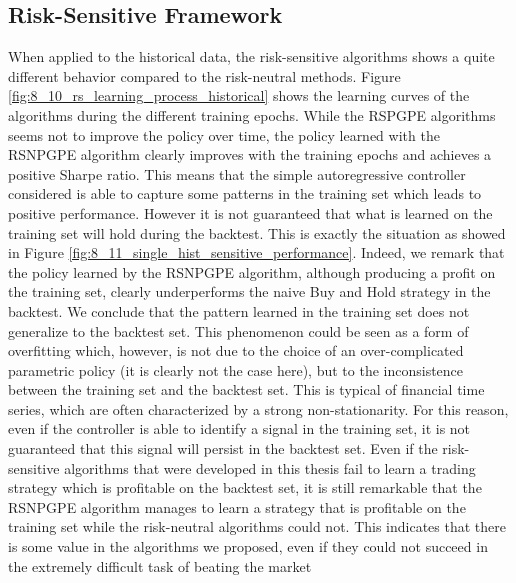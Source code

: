\subsection{Risk-Sensitive Framework}
When applied to the historical data, the risk-sensitive algorithms shows a quite different behavior compared to the risk-neutral methods. Figure \ref{fig:8_10_rs_learning_process_historical} shows the learning curves of the algorithms during the different training epochs. While the \gls{RSPGPE} algorithms seems not to improve the policy over time, the policy learned with the \gls{RSNPGPE} algorithm clearly improves with the training epochs and achieves a positive Sharpe ratio. This means that the simple autoregressive controller considered is able to capture some patterns in the training set which leads to positive performance. However it is not guaranteed that what is learned on the training set will hold during the backtest. This is exactly the situation as showed in Figure \ref{fig:8_11_single_hist_sensitive_performance}. Indeed, we remark that the policy learned by the \gls{RSNPGPE} algorithm, although producing a profit on the training set, clearly underperforms the naive Buy and Hold strategy in the backtest. We conclude that the pattern learned in the training set does not generalize to the backtest set. This phenomenon could be seen as a form of overfitting which, however, is not due to the choice of an over-complicated parametric policy (it is clearly not the case here), but to the inconsistence between the training set and the backtest set. This is typical of financial time series, which are often characterized by a strong non-stationarity. For this reason, even if the controller is able to identify a signal in the training set, it is not guaranteed that this signal will persist in the backtest set. Even if the risk-sensitive algorithms that were developed in this thesis fail to learn a trading strategy which is profitable on the backtest set, it is still remarkable that the \gls{RSNPGPE} algorithm manages to learn a strategy that is profitable on the training set while the risk-neutral algorithms could not. This indicates that there is some value in the algorithms we proposed, even if they could not succeed in the extremely difficult task of beating the market

